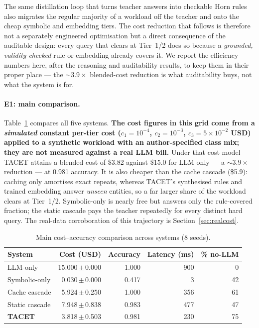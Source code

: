 \documentclass[11pt]{article}
\theoremstyle{plain}
\newcommand{\akCost}{3.82}
\newcommand{\akAcc}{0.981}
\newcommand{\llmCost}{15.0}
\newcommand{\costFactor}{3.9}
\newcommand{\cacheCost}{5.9}
\newcommand{\seeds}{8}
\renewcommand{\akCost}{3.82}
\renewcommand{\akAcc}{0.981}
\renewcommand{\llmCost}{15.0}
\renewcommand{\cacheCost}{5.9}
\renewcommand{\costFactor}{3.9}
\renewcommand{\seeds}{8}
\begin{document}
The same distillation loop that turns teacher answers into checkable Horn
rules also migrates the regular majority of a workload off the teacher and
onto the cheap symbolic and embedding tiers. The cost reduction that follows
is therefore not a separately engineered optimisation but a direct
consequence of the auditable design: every query that clears at Tier~1/2
does so because a \emph{grounded, validity-checked} rule or embedding already
covers it. We report the efficiency numbers here, after the reasoning and
auditability results, to keep them in their proper place --- the
${\sim}\costFactor\times$ blended-cost reduction is what auditability buys,
not what the system is for.

\paragraph{E1: main comparison.} Table~\ref{tab:main} compares all five
systems. \textbf{The cost figures in this grid come from a \emph{simulated}
constant per-tier cost ($c_1{=}10^{-4}$, $c_2{=}10^{-3}$,
$c_3{=}5{\times}10^{-2}$ USD) applied to a synthetic workload with an
author-specified class mix; they are not measured against a real LLM bill.}
Under that cost model TACET attains a blended cost of \$\akCost{} against
\$\llmCost{} for LLM-only --- a ${\sim}\costFactor\times$ reduction --- at
\akAcc{} accuracy. It is also cheaper than the cache cascade (\$\cacheCost{}):
caching only amortises exact repeats, whereas TACET's synthesised rules
and trained embedding answer \emph{unseen} entities, so a far larger share
of the workload clears at Tier~1/2. Symbolic-only is nearly free but
answers only the rule-covered fraction; the static cascade pays the teacher
repeatedly for every distinct hard query. The real-data corroboration of this
trajectory is Section~\ref{sec:realcost}.

\begin{table}[t]
\centering
\caption{Main cost--accuracy comparison across systems (\seeds{} seeds).}
\label{tab:main}
\begin{tabular}{lrrrr}
\toprule
System & Cost (USD) & Accuracy & Latency (ms) & \% no-LLM \\
\midrule
LLM-only & 15.000\,$\pm$\,0.000 & 1.000 & 900 & 0 \\
Symbolic-only & 0.030\,$\pm$\,0.000 & 0.417 & 3 & 42 \\
Cache cascade & 5.924\,$\pm$\,0.250 & 1.000 & 356 & 61 \\
Static cascade & 7.948\,$\pm$\,0.838 & 0.983 & 477 & 47 \\
\textbf{TACET} & 3.818\,$\pm$\,0.503 & 0.981 & 230 & 75 \\
\bottomrule
\end{tabular}

\end{table}
\end{document}
